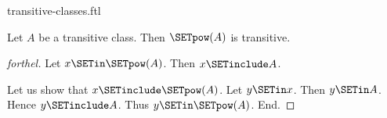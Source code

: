 \documentclass{naproche-library}
\begin{document}
\begin{smodule}[title=Transitive Classes]{transitive-classes.ftl}
\begin{proposition}[forthel,id=SET_THEORY_01_6995689103949824]
  Let $A$ be a transitive class.
  Then $\SETpow(A)$ is transitive.
\end{proposition}
\begin{proof}[forthel]
  Let $x \SETin \SETpow(A)$.
  Then $x \SETinclude A$.

  Let us show that $x \SETinclude \SETpow(A)$.
    Let $y \SETin x$.
    Then $y \SETin A$.
    Hence $y \SETinclude A$.
    Thus $y \SETin \SETpow(A)$.
  End.
\end{proof}
\end{smodule}
\end{document}
